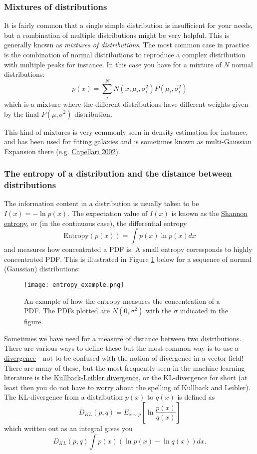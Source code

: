 \documentclass[a4paper,10pt]{article}
\newcommand{\link}[2]{{\color{blue}\href{#1}{#2}}}
\begin{document}
\subsubsection{ Mixtures of distributions}

It is fairly common that a single simple distribution is insufficient for your needs, but a combination of multiple distributions might be very helpful. This is generally known as \textit{mixtures of distributions}. The most common case in practice is the combination of normal distributions to reproduce a complex distribution with multiple peaks  for instance. In this case you have for a mixture of $N$ normal distributions:
$$p(x) = \sum_{i}^{N} N\left(x; \mu_i, \sigma_i^2\right) P\left(\mu_i,\sigma_i^2 \right)$$
which is a mixture where the different distributions have different weights given by the final $P(\mu, \sigma^2)$ distribution.

This kind of mixtures is very commonly seen in density estimation for instance, and has been used for fitting galaxies and is sometimes known as multi-Gaussian Expansion there (e.g. \link{http://adsabs.harvard.edu/abs/2002MNRAS.333..400C}{Capellari 2002}). 


\subsubsection{ The entropy of a distribution and the distance between distributions}

The information content in a distribution is usually taken to be $I(x) = -\ln p(x)$. The expectation value of $I(x)$ is known as the \link{https://en.wikipedia.org/wiki/Entropy_(information_theory)}{Shannon entropy}, or (in the continuous case), the differential entropy
$$\mathrm{Entropy}(p(x)) = \int p(x) \ln p(x) dx $$ and measures how concentrated a PDF is. A small entropy corresponds to highly concentrated PDF. This is illustrated in Figure \ref{fig:entr} below for a sequence of normal (Gaussian) distributions:

\begin{figure}[!h]
\texttt{[image: entropy\_example.png]}
\caption{An example of how the entropy measures the concentration of a PDF. The PDFs plotted are $N(0, \sigma^2)$ with the $\sigma$ indicated in the figure.}
\label{fig:entr}
\end{figure}


Sometimes we have need for a measure of distance between two distributions. There are various ways to define these but the most common way is to use a \link{https://en.wikipedia.org/wiki/Divergence_(statistics)}{divergence} - not to be confused with the notion of divergence in a vector field! There are many of these, but the most frequently seen in the machine learning literature is the \link{https://en.wikipedia.org/wiki/Kullback\%E2\%80\%93Leibler_divergence}{Kullback-Leibler divergence}, or the KL-divergence for short (at least then you do not have to worry about the spelling of Kullback and Leibler). The KL-divergence from a distribution $p(x)$ to $q(x)$ is defined as
$$D_{KL}(p, q) = E_{x\sim p} \left[\ln \frac{p(x)}{q(x)} \right]$$
which written out as an integral gives you 
$$D_{KL}(p, q)\int p(x) \left( \ln p(x) -\ln q(x) \right) dx.$$
\end{document}
